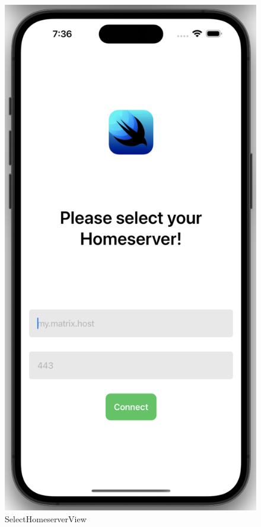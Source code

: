    \begin{figure}[h]
        \includegraphics[scale=0.5]{homeserver}
        \centering
        \caption{SelectHomeserverView}\label{fig:selecthomeserverview}
    \end{figure}
